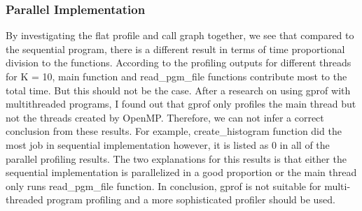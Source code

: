 \documentclass{article}
\begin{document}
\subsubsection{Parallel Implementation}
\qquad By investigating the flat profile and call graph together, we see that compared to the sequential program, there is a different result in terms of time proportional division to the functions. According to the profiling outputs for different threads for K = 10, main function and read\_pgm\_file functions contribute most to the total time. But this should not be the case. After a research on using gprof with multithreaded programs, I found out that gprof only profiles the main thread but not the threads created by OpenMP. Therefore, we can not infer a correct conclusion from these results. For example, create\_histogram function did the most job in sequential implementation however, it is listed as 0 in all of the parallel profiling results. The two explanations for this results is that either the sequential implementation is parallelized in a good proportion or the main thread only runs read\_pgm\_file function. In conclusion, gprof is not suitable for multi-threaded program profiling and a more sophisticated profiler should be used.
\end{document}
